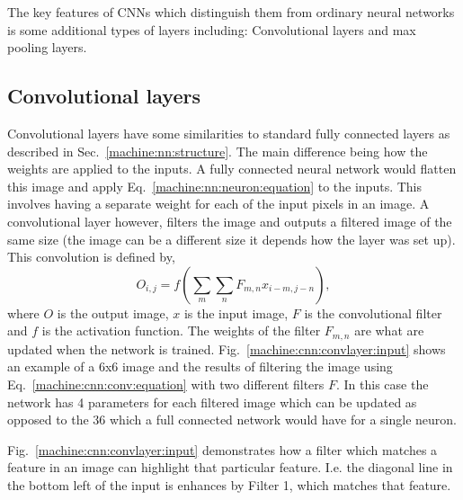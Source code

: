 The key features of \acp{CNN} which distinguish them from ordinary neural networks is some additional types of layers including: Convolutional layers and max pooling layers. 


\subsection{Convolutional layers}

Convolutional layers have some similarities to standard fully connected layers as described in Sec.~\ref{machine:nn:structure}. 
The main difference being how the weights are applied to the inputs.
A fully connected neural network would flatten this image and apply Eq.~\ref{machine:nn:neuron:equation} to the inputs.
This involves having a separate weight for each of the input pixels in an image.
A convolutional layer however, filters the image and outputs a filtered image of the same size (the image can be a different size it depends how the layer was set up).
This convolution is defined by,
\begin{equation}
\label{machine:cnn:conv:equation}
O_{i,j} = f\left( \sum_{m} \sum_{n} F_{m,n}x_{i-m,j-n}\right) ,
\end{equation}
where $O$ is the output image, $x$ is the input image, $F$ is the convolutional filter and $f$ is the activation function.
The weights of the filter $F_{m,n}$ are what are updated when the network is trained.
Fig.~\ref{machine:cnn:convlayer:input} shows an example of a 6x6 image and the results of filtering the image using Eq.~\ref{machine:cnn:conv:equation} with two different filters $F$. 
In this case the network has 4 parameters for each filtered image which can be updated as opposed to the 36 which a full connected network would have for a single neuron.

Fig.~\ref{machine:cnn:convlayer:input} demonstrates how a filter which matches a feature in an image can highlight that particular feature. 
I.e. the diagonal line in the bottom left of the input is enhances by Filter 1, which matches that feature. 

